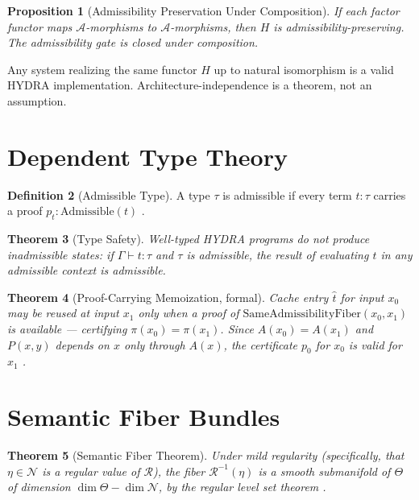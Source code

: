 \documentclass[12pt, a4paper]{article}
\theoremstyle{rsvpstyle}
\newtheorem{theorem}{Theorem}[section]
\newtheorem{proposition}[theorem]{Proposition}
\theoremstyle{definition}
\newtheorem{definition}[theorem]{Definition}
\newcommand{\Adm}{\mathcal{A}}
\newcommand{\Real}{\mathcal{R}}
\begin{document}
\begin{proposition}[Admissibility Preservation Under Composition]
If each factor functor maps $\Adm$-morphisms to $\Adm$-morphisms, then $H$
is admissibility-preserving. The admissibility gate is closed under composition.
\end{proposition}

Any system realizing the same functor $H$ up to natural isomorphism is a
valid HYDRA implementation. Architecture-independence is a theorem, not an
assumption.

\section{Dependent Type Theory}

\begin{definition}[Admissible Type]
A type $\tau$ is admissible if every term $t : \tau$ carries a proof
$p_t : \mathrm{Admissible}(t)$ \citep{CurryHoward}.
\end{definition}

\begin{theorem}[Type Safety]
Well-typed HYDRA programs do not produce inadmissible states: if
$\Gamma \vdash t : \tau$ and $\tau$ is admissible, the result of evaluating
$t$ in any admissible context is admissible.
\end{theorem}

\begin{theorem}[Proof-Carrying Memoization, formal]
Cache entry $\hat t$ for input $x_0$ may be reused at input $x_1$ only when
a proof of $\mathrm{SameAdmissibilityFiber}(x_0, x_1)$ is available ---
certifying $\pi(x_0) = \pi(x_1)$. Since $A(x_0) = A(x_1)$ and $P(x,y)$
depends on $x$ only through $A(x)$, the certificate $p_0$ for $x_0$ is
valid for $x_1$ \citep{CurryHoward}.
\end{theorem}

\section{Semantic Fiber Bundles}

\begin{theorem}[Semantic Fiber Theorem]
Under mild regularity (specifically, that $\eta \in \mathcal{N}$ is a regular
value of $\Real$), the fiber $\Real^{-1}(\eta)$ is a smooth submanifold of
$\Theta$ of dimension $\dim\Theta - \dim\mathcal{N}$, by the regular level set
theorem \citep{Lee2013,Hatcher2002}.
\end{theorem}
\end{document}
